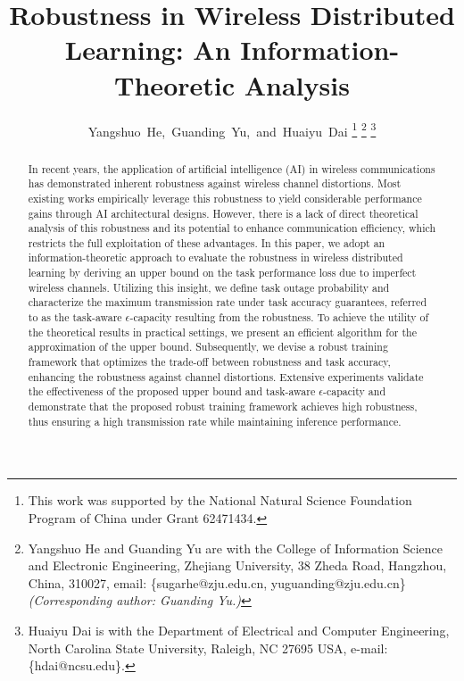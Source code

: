 \documentclass[lettersize,journal]{IEEEtran}
\theoremstyle{definition}
\theoremstyle{plain}
\begin{document}
\title{Robustness in Wireless Distributed Learning: An Information-Theoretic Analysis}

\author{Yangshuo~He,~Guanding~Yu,~and~Huaiyu~Dai%
\thanks{This work was supported by the National Natural Science Foundation Program of China under Grant 62471434.}
\thanks{Yangshuo He and Guanding Yu are with the College of Information Science and Electronic Engineering, Zhejiang University, 38 Zheda Road, Hangzhou, China, 310027, email: \{sugarhe@zju.edu.cn, yuguanding@zju.edu.cn\} \textit{(Corresponding author: Guanding Yu.)}}
\thanks{Huaiyu Dai is with the Department of Electrical and Computer Engineering, North Carolina State University, Raleigh, NC 27695 USA, e-mail: \{hdai@ncsu.edu\}.}
}


\maketitle

\begin{abstract}
In recent years, the application of artificial intelligence (AI) in wireless communications has demonstrated inherent robustness against wireless channel distortions. Most existing works empirically leverage this robustness to yield considerable performance gains through AI architectural designs. However, there is a lack of direct theoretical analysis of this robustness and its potential to enhance communication efficiency, which restricts the full exploitation of these advantages. In this paper, we adopt an information-theoretic approach to evaluate the robustness in wireless distributed learning by deriving an upper bound on the task performance loss due to imperfect wireless channels. Utilizing this insight, we define task outage probability and characterize the maximum transmission rate under task accuracy guarantees, referred to as the task-aware $\epsilon$-capacity resulting from the robustness. 
To achieve the utility of the theoretical results in practical settings, we present an efficient algorithm for the approximation of the upper bound. Subsequently, we devise a robust training framework that optimizes the trade-off between robustness and task accuracy, enhancing the robustness against channel distortions. Extensive experiments validate the effectiveness of the proposed upper bound and task-aware $\epsilon$-capacity and demonstrate that the proposed robust training framework achieves high robustness, thus ensuring a high transmission rate while maintaining inference performance.
\end{abstract}
\end{document}
